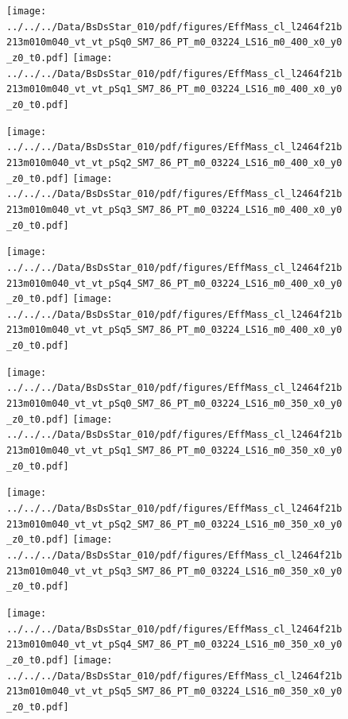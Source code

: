 \documentclass[a4paper,10pt]{article}
\begin{document}
\begin{figure}[p]
 \texttt{[image: ../../../Data/BsDsStar\_010/pdf/figures/EffMass\_cl\_l2464f21b213m010m040\_vt\_vt\_pSq0\_SM7\_86\_PT\_m0\_03224\_LS16\_m0\_400\_x0\_y0\_z0\_t0.pdf]} 
 \texttt{[image: ../../../Data/BsDsStar\_010/pdf/figures/EffMass\_cl\_l2464f21b213m010m040\_vt\_vt\_pSq1\_SM7\_86\_PT\_m0\_03224\_LS16\_m0\_400\_x0\_y0\_z0\_t0.pdf]} 
 \end{figure}
\begin{figure}[p]
 \texttt{[image: ../../../Data/BsDsStar\_010/pdf/figures/EffMass\_cl\_l2464f21b213m010m040\_vt\_vt\_pSq2\_SM7\_86\_PT\_m0\_03224\_LS16\_m0\_400\_x0\_y0\_z0\_t0.pdf]} 
 \texttt{[image: ../../../Data/BsDsStar\_010/pdf/figures/EffMass\_cl\_l2464f21b213m010m040\_vt\_vt\_pSq3\_SM7\_86\_PT\_m0\_03224\_LS16\_m0\_400\_x0\_y0\_z0\_t0.pdf]} 
 \end{figure}
\begin{figure}[p]
 \texttt{[image: ../../../Data/BsDsStar\_010/pdf/figures/EffMass\_cl\_l2464f21b213m010m040\_vt\_vt\_pSq4\_SM7\_86\_PT\_m0\_03224\_LS16\_m0\_400\_x0\_y0\_z0\_t0.pdf]} 
 \texttt{[image: ../../../Data/BsDsStar\_010/pdf/figures/EffMass\_cl\_l2464f21b213m010m040\_vt\_vt\_pSq5\_SM7\_86\_PT\_m0\_03224\_LS16\_m0\_400\_x0\_y0\_z0\_t0.pdf]} 
 \end{figure}
\clearpage
\begin{figure}[p]
 \texttt{[image: ../../../Data/BsDsStar\_010/pdf/figures/EffMass\_cl\_l2464f21b213m010m040\_vt\_vt\_pSq0\_SM7\_86\_PT\_m0\_03224\_LS16\_m0\_350\_x0\_y0\_z0\_t0.pdf]} 
 \texttt{[image: ../../../Data/BsDsStar\_010/pdf/figures/EffMass\_cl\_l2464f21b213m010m040\_vt\_vt\_pSq1\_SM7\_86\_PT\_m0\_03224\_LS16\_m0\_350\_x0\_y0\_z0\_t0.pdf]} 
 \end{figure}
\begin{figure}[p]
 \texttt{[image: ../../../Data/BsDsStar\_010/pdf/figures/EffMass\_cl\_l2464f21b213m010m040\_vt\_vt\_pSq2\_SM7\_86\_PT\_m0\_03224\_LS16\_m0\_350\_x0\_y0\_z0\_t0.pdf]} 
 \texttt{[image: ../../../Data/BsDsStar\_010/pdf/figures/EffMass\_cl\_l2464f21b213m010m040\_vt\_vt\_pSq3\_SM7\_86\_PT\_m0\_03224\_LS16\_m0\_350\_x0\_y0\_z0\_t0.pdf]} 
 \end{figure}
\begin{figure}[p]
 \texttt{[image: ../../../Data/BsDsStar\_010/pdf/figures/EffMass\_cl\_l2464f21b213m010m040\_vt\_vt\_pSq4\_SM7\_86\_PT\_m0\_03224\_LS16\_m0\_350\_x0\_y0\_z0\_t0.pdf]} 
 \texttt{[image: ../../../Data/BsDsStar\_010/pdf/figures/EffMass\_cl\_l2464f21b213m010m040\_vt\_vt\_pSq5\_SM7\_86\_PT\_m0\_03224\_LS16\_m0\_350\_x0\_y0\_z0\_t0.pdf]} 
 \end{figure}
\end{document}
